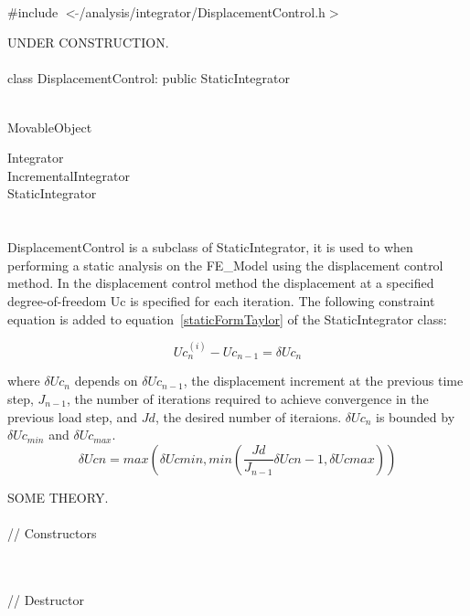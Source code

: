 
   \\
\#include $<\tilde{ }$/analysis/integrator/DisplacementControl.h$>$  


UNDER CONSTRUCTION.\\

  \\
class DisplacementControl: public StaticIntegrator  


 \\
MovableObject 

\indent\indent Integrator \\
\indent\indent\indent IncrementalIntegrator \\
\indent\indent\indent\indent StaticIntegrator \\
\indent\indent\indent\indent{} \\

 \\ 
\indent DisplacementControl is a subclass of StaticIntegrator, it is
used to when performing a static analysis on the FE\_Model using the
displacement control method. In the displacement control method the
displacement at a specified degree-of-freedom Uc is specified for each
iteration. The following constraint equation is added to
equation~\ref{staticFormTaylor} of the StaticIntegrator class: 

\[ 
Uc_n^{(i)} - Uc_{n-1} = \delta Uc_n
\]

\noindent where $\delta Uc_n$ depends on $\delta Uc_{n-1}$,
the displacement increment at the previous time step, $J_{n-1}$,
the number of iterations required to achieve convergence in the
previous load step, and $Jd$, the desired number of iteraions. $\delta
Uc_n$ is bounded by $\delta Uc_{min}$  and $\delta Uc_{max}$. \\


\[ 
\delta Ucn = max \left( \delta Uc{min}, min \left(
\frac{Jd}{J_{n-1}} \delta Uc{n-1}, \delta Uc{max} \right) \right)
\]

SOME THEORY.\\

 \\
// Constructors 

\\ \\
// Destructor 

